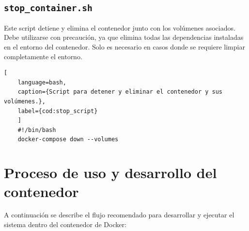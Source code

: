 \subsection{\texttt{stop\_container.sh}}

Este script detiene y elimina el contenedor junto con los volúmenes asociados. Debe utilizarse con precaución, ya que elimina todas las dependencias instaladas en el entorno del contenedor. Solo es necesario en casos donde se requiere limpiar completamente el entorno.

\begin{lstlisting}[
	language=bash,
	caption={Script para detener y eliminar el contenedor y sus volúmenes.},
	label={cod:stop_script}
	]
	#!/bin/bash
	docker-compose down --volumes
\end{lstlisting}

\section{Proceso de uso y desarrollo del contenedor}

A continuación se describe el flujo recomendado para desarrollar y ejecutar el sistema dentro del contenedor de Docker:

